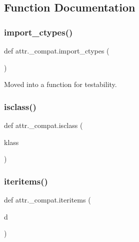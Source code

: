 \subsection{Function Documentation}
\mbox{\label{namespaceattr_1_1__compat_af86677ffeb442a606a72b93a848717cb}} 
\subsubsection{\texorpdfstring{import\+\_\+ctypes()}{import\_ctypes()}}
{\footnotesize\ttfamily def attr.\+\_\+compat.\+import\+\_\+ctypes (\begin{DoxyParamCaption}{ }\end{DoxyParamCaption})}

\begin{DoxyVerb}Moved into a function for testability.
\end{DoxyVerb}
 \mbox{\label{namespaceattr_1_1__compat_a529525094853e4ac7f75fa07e838b749}} 
\subsubsection{\texorpdfstring{isclass()}{isclass()}}
{\footnotesize\ttfamily def attr.\+\_\+compat.\+isclass (\begin{DoxyParamCaption}\item[{}]{klass }\end{DoxyParamCaption})}

\mbox{\label{namespaceattr_1_1__compat_ae4db7daca1dce2b85955337bea02e0a9}} 
\subsubsection{\texorpdfstring{iteritems()}{iteritems()}}
{\footnotesize\ttfamily def attr.\+\_\+compat.\+iteritems (\begin{DoxyParamCaption}\item[{}]{d }\end{DoxyParamCaption})}

